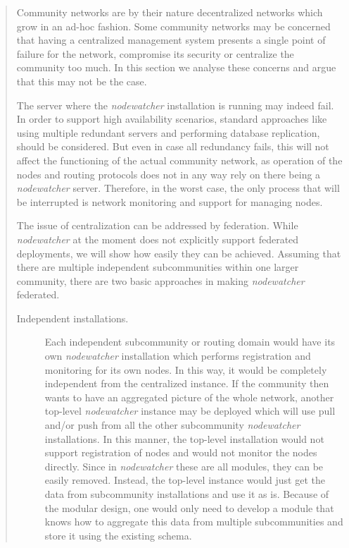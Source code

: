 \documentclass[12pt,twoside,a4paper]{report}
\newcommand{\nodewatcher}{\textit{nodewatcher}}
\begin{document}
\begin{quote}
Community networks are by their nature decentralized networks which grow in an ad-hoc fashion.
Some community networks may be concerned that having a centralized management system presents a single point of failure for the network, compromise its security or centralize the community too much.
In this section we analyse these concerns and argue that this may not be the case.

The server where the \nodewatcher{} installation is running may indeed fail.
In order to support high availability scenarios, standard approaches like using multiple redundant servers and performing database replication, should be considered.
But even in case all redundancy fails, this will not affect the functioning of the actual community network, as operation of the nodes and routing protocols does not in any way rely on there being a \nodewatcher{} server.
Therefore, in the worst case, the only process that will be interrupted is network monitoring and support for managing nodes.

The issue of centralization can be addressed by federation. 
While \nodewatcher{} at the moment does not explicitly support federated deployments, we will show how easily they can be achieved.
Assuming that there are multiple independent subcommunities within one larger community, there are two basic approaches in making \nodewatcher{} federated.

\begin{description}
    \item[Independent installations.] Each independent subcommunity or routing domain would have its own \nodewatcher{} installation which performs registration and monitoring for its own nodes.
    In this way, it would be completely independent from the centralized instance.
    If the community then wants to have an aggregated picture of the whole network, another top-level \nodewatcher{} instance may be deployed which will use pull and/or push from all the other subcommunity \nodewatcher{} installations.
    In this manner, the top-level installation would not support registration of nodes and would not monitor the nodes directly.
    Since in \nodewatcher{} these are all modules, they can be easily removed.
    Instead, the top-level instance would just get the data from subcommunity installations and use it as is.
    Because of the modular design, one would only need to develop a module that knows how to aggregate this data from multiple subcommunities and store it using the existing schema.


\end{description}
\end{quote}
\end{document}
